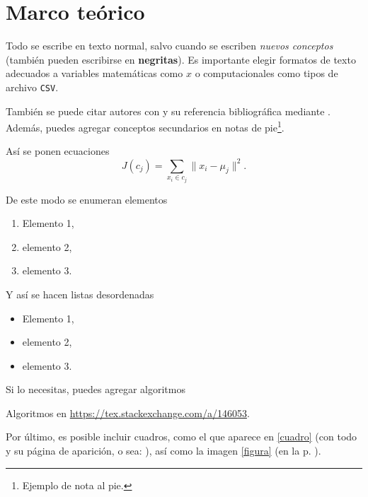 \chapter{Marco teórico}
\label{chap:background}


Todo se escribe en texto normal, salvo cuando se escriben \textit{nuevos conceptos} (también pueden escribirse en \textbf{negritas}). Es importante elegir formatos de texto adecuados a variables matemáticas como $x$ o computacionales como tipos de archivo \texttt{CSV}.

También se puede citar autores con \citet{arias2006} y su referencia bibliográfica mediante \cite{arias2006}. Además, puedes agregar conceptos secundarios en notas de pie\footnote{Ejemplo de nota al pie.}.

Así se ponen ecuaciones
\begin{equation}
J(c_j) = \sum_{x_i \in c_j} \lVert x_i - \mu_j \rVert ^2.
\end{equation}

De este modo se enumeran elementos
\begin{enumerate}
    \item Elemento 1,
    \item elemento 2,
    \item elemento 3.
\end{enumerate}

Y así se hacen listas desordenadas
\begin{itemize}
    \item Elemento 1,
    \item elemento 2,
    \item elemento 3.
\end{itemize}

Si lo necesitas, puedes agregar algoritmos
\begin{algorithm}
    \caption{Algoritmos en \url{https://tex.stackexchange.com/a/146053}.}
    \SetAlgoLined
    \label{alg}
\end{algorithm}

Por último, es posible incluir cuadros, como el que aparece en \ref{cuadro} (con todo y su página de aparición, o sea: \pageref{cuadro}), así como la imagen \ref{figura} (en la p. \pageref{figura}).

